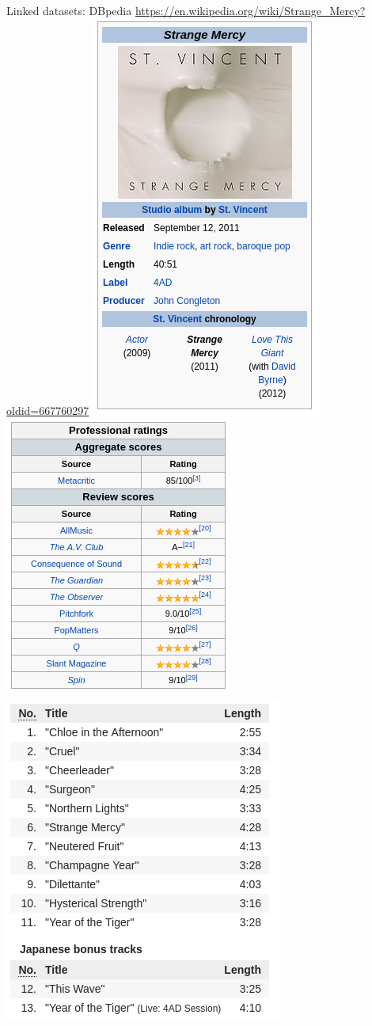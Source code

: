 \documentclass{beamer}
\begin{document}
\begin{frame}{Linked datasets: DBpedia}
\url{https://en.wikipedia.org/wiki/Strange_Mercy?oldid=667760297}
\includegraphics[width=.32\textwidth]{strange_mercy1.png}
\includegraphics[width=.32\textwidth]{strange_mercy2.png}
\includegraphics[width=.32\textwidth]{strange_mercy3.png}
\end{frame}
\end{document}
